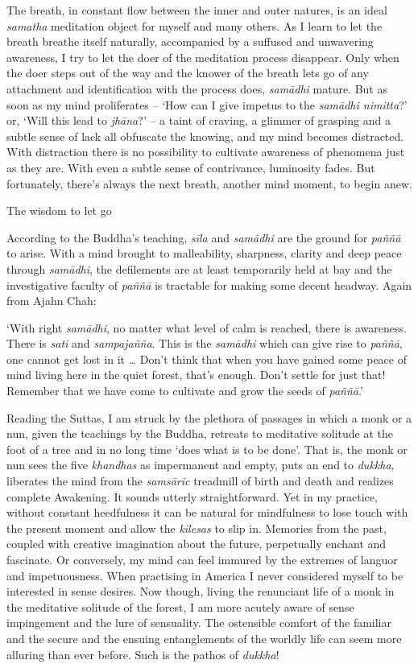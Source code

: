 The breath, in constant flow between the inner and outer natures, is an
ideal \emph{samatha} meditation object for myself and many others. As I
learn to let the breath breathe itself naturally, accompanied by a
suffused and unwavering awareness, I try to let the doer of the
meditation process disappear. Only when the doer steps out of the way
and the knower of the breath lets go of any attachment and
identification with the process does, \emph{samādhi} mature. But as soon
as my mind proliferates -- `How can I give impetus to the \emph{samādhi
nimitta}?' or, `Will this lead to \emph{jhāna}?' -- a taint of craving,
a glimmer of grasping and a subtle sense of lack all obfuscate the
knowing, and my mind becomes distracted. With distraction there is no
possibility to cultivate awareness of phenomena just as they are. With
even a subtle sense of contrivance, luminosity fades. But fortunately,
there's always the next breath, another mind moment, to begin anew.

The wisdom to let go

According to the Buddha's teaching, \emph{sīla} and \emph{samādhi} are
the ground for \emph{paññā} to arise. With a mind brought to
malleability, sharpness, clarity and deep peace through \emph{samādhi},
the defilements are at least temporarily held at bay and the
investigative faculty of \emph{paññā} is tractable for making some
decent headway. Again from Ajahn Chah:

`With right \emph{samādhi}, no matter what level of calm is reached,
there is awareness. There is \emph{sati} and \emph{sampajañña}. This is
the \emph{samādhi} which can give rise to \emph{paññā}, one cannot get
lost in it \ldots{} Don't think that when you have gained some peace of
mind living here in the quiet forest, that's enough. Don't settle for
just that! Remember that we have come to cultivate and grow the seeds of
\emph{paññā}.'

Reading the Suttas, I am struck by the plethora of passages in which a
monk or a nun, given the teachings by the Buddha, retreats to meditative
solitude at the foot of a tree and in no long time `does what is to be
done'. That is, the monk or nun sees the five \emph{khandhas} as
impermanent and empty, puts an end to \emph{dukkha}, liberates the mind
from the \emph{samsāric} treadmill of birth and death and realizes
complete Awakening. It sounds utterly straightforward. Yet in my
practice, without constant heedfulness it can be natural for mindfulness
to lose touch with the present moment and allow the \emph{kilesas} to
slip in. Memories from the past, coupled with creative imagination about
the future, perpetually enchant and fascinate. Or conversely, my mind
can feel immured by the extremes of languor and impetuousness. When
practising in America I never considered myself to be interested in
sense desires. Now though, living the renunciant life of a monk in the
meditative solitude of the forest, I am more acutely aware of sense
impingement and the lure of sensuality. The ostensible comfort of the
familiar and the secure and the ensuing entanglements of the worldly
life can seem more alluring than ever before. Such is the pathos of
\emph{dukkha}!

